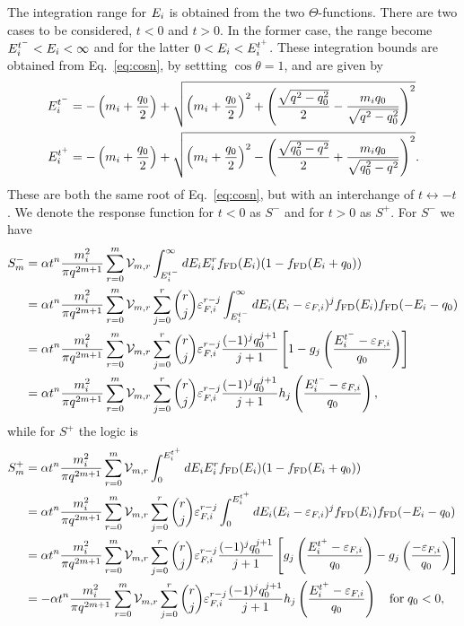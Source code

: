 The integration range for $E_i$ is obtained from the two $\Theta$-functions. There are two cases to be considered, $t<0$ and $t>0$. In the former case, the range become $E_i^{t^-}<E_i<\infty$ and for the latter $0<E_i<E_i^{t^+}$. These integration bounds are obtained from Eq.~\ref{eq:cosn}, by settting $\cos\theta = 1$, and are given by
\begin{align}
    E_i^{t^-} & = -\left( m_i+\frac{q_0}{2}\right) + \sqrt{\left( m_i+\frac{q_0}{2}\right)^2 + \left( \frac{\sqrt{q^2 - q_0^2}}{2} - \frac{m_i q_0}{\sqrt{q^2 - q_0^2}}\right)^2}\\
    E_i^{t^+} & = -\left( m_i+\frac{q_0}{2}\right) + \sqrt{\left( m_i+\frac{q_0}{2}\right)^2 - \left( \frac{\sqrt{q_0^2 - q^2}}{2} + \frac{m_i q_0}{\sqrt{q_0^2 - q^2}}\right)^2}.
\end{align}
These are both the same root of Eq.~\ref{eq:cosn}, but with an interchange of $t\leftrightarrow -t$. We denote the response function for $t<0$ as $S^-$ and for $t>0$ as $S^+$. For $S^-$ we have
\begin{align}
    S^-_m & = \alpha t^n \frac{m_i^2}{\pi q^{2m + 1}}\sum_{r=0}^m \mathcal{V}_{m,r}\int_{E_i^{t^-}}^\infty dE_i E_i^r f_{\rm FD}(E_i)(1 - f_{\rm FD}(E_i +q_0))\\
    & = \alpha t^n \frac{m_i^2}{\pi q^{2m + 1}}\sum_{r=0}^m \mathcal{V}_{m,r} \sum_{j = 0}^r \binom{r}{j} \varepsilon_{F,i}^{r-j}\int_{E_i^{t^-}}^\infty dE_i (E_i - \varepsilon_{F,i})^j f_{\rm FD}(E_i)f_{\rm FD}(-E_i - q_0)\\
    & =  \alpha t^n \frac{m_i^2}{\pi q^{2m + 1}}\sum_{r=0}^m \mathcal{V}_{m,r} \sum_{j = 0}^r \binom{r}{j} \varepsilon_{F,i}^{r-j}  \frac{(-1)^{j} q_0^{j+1}}{j+1}\left[ 1 - g_j\left( \frac{E_i^{t^-} - \varepsilon_{F,i}}{q_0}\right) \right]\\
    & =  \alpha t^n \frac{m_i^2}{\pi q^{2m + 1}}\sum_{r=0}^m \mathcal{V}_{m,r} \sum_{j = 0}^r \binom{r}{j} \varepsilon_{F,i}^{r-j}  \frac{(-1)^{j} q_0^{j+1}}{j+1} h_j\left( \frac{E_i^{t^-} - \varepsilon_{F,i}}{q_0}\right),
\end{align}
while for $S^+$ the logic is
\begin{align}
    S^+_m & = \alpha t^n \frac{m_i^2}{\pi q^{2m + 1}}\sum_{r=0}^m \mathcal{V}_{m,r}\int_{0}^{E_i^{t^+}} dE_i E_i^r f_{\rm FD}(E_i)(1 - f_{\rm FD}(E_i +q_0))\\
    & = \alpha t^n \frac{m_i^2}{\pi q^{2m + 1}}\sum_{r=0}^m \mathcal{V}_{m,r} \sum_{j = 0}^r \binom{r}{j} \varepsilon_{F,i}^{r-j}\int_{0}^{E_i^{t^+}} dE_i (E_i - \varepsilon_{F,i})^j f_{\rm FD}(E_i)f_{\rm FD}(-E_i - q_0)\\
    & =  \alpha t^n \frac{m_i^2}{\pi q^{2m + 1}}\sum_{r=0}^m \mathcal{V}_{m,r} \sum_{j = 0}^r \binom{r}{j} \varepsilon_{F,i}^{r-j}  \frac{(-1)^{j} q_0^{j+1}}{j+1}\left[ g_j\left( \frac{E_i^{t^+} - \varepsilon_{F,i}}{q_0}\right) -  g_j\left( \frac{ - \varepsilon_{F,i}}{q_0}\right) \right]\\
    & =  -\alpha t^n \frac{m_i^2}{\pi q^{2m + 1}}\sum_{r=0}^m \mathcal{V}_{m,r} \sum_{j = 0}^r \binom{r}{j} \varepsilon_{F,i}^{r-j}  \frac{(-1)^{j} q_0^{j+1}}{j+1} h_j\left( \frac{E_i^{t^+} - \varepsilon_{F,i}}{q_0}\right)\quad \textrm{for}\; q_0<0,
\end{align}
